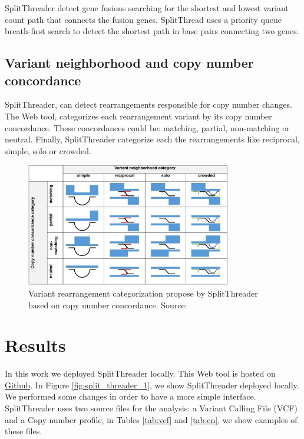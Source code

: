 \documentclass{svproc}
\begin{document}
SplitThreader detect gene fusions searching for the shortest and lowest variant count path that connects the fusion genes. SplitThread uses a priority queue breath-first search to detect the shortest path in base pairs connecting two genes.\\

\subsection{Variant neighborhood and copy number concordance}
SplitThreader, can detect rearrangements responsible for copy number changes. The Web tool, categorizes each rearrangement variant by its copy number concordance. These concordances could be: matching, partial, non-matching or neutral. Finally, SplitThreader categorize each the rearrangements like reciprocal, simple, solo or crowded. 

\begin{figure}[h]
	\centering
	\includegraphics[width=0.8\textwidth]{img/splitthreader/var_cat}
	\caption{Variant rearrangement categorization propose by SplitThreader based on copy number concordance. Source: \cite{nattestad2016splitthreader}}
	\label{fig:graph}
\end{figure}

\section{Results} 

In this work we deployed SplitThreader locally. This Web tool is hosted on \href{https://github.com/MariaNattestad/SplitThreader}{Github}. In Figure \ref{fig:split_threader_1}, we show SplitThreader deployed locally. We performed some changes in order to have a more simple interface. SplitThreader uses two source files for the analysis: a Variant Calling File (VCF) and a Copy number profile, in Tables \ref{tab:vcf} and \ref{tab:cn}, we show examples of these files.\\
\end{document}
